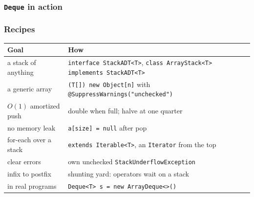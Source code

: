 \documentclass[aspectratio=169,10pt,compress]{beamer}
\begin{document}
\begin{frame}[t,fragile] \frametitle{\texttt{Deque} in action}
\end{frame}





\begin{frame}[t,fragile] \frametitle{Recipes}
  \begin{center}\footnotesize
  \begin{tabular}{ll}
    \toprule
    \textbf{Goal} & \textbf{How} \\
    \midrule
    a stack of anything            & \texttt{interface StackADT<T>}, \texttt{class ArrayStack<T> implements StackADT<T>} \\
    a generic array                & \texttt{(T[]) new Object[n]} with \texttt{@SuppressWarnings("unchecked")} \\
    $O(1)$ amortized push          & double when full; halve at one quarter \\
    no memory leak                 & \texttt{a[size] = null} after pop \\
    for-each over a stack          & \texttt{extends Iterable<T>}, an \texttt{Iterator} from the top \\
    clear errors                   & own unchecked \texttt{StackUnderflowException} \\
    infix to postfix               & shunting yard: operators wait on a stack \\
    in real programs               & \texttt{Deque<T> s = new ArrayDeque<>()} \\
    \bottomrule
  \end{tabular}
  \end{center}
\end{frame}
\end{document}
